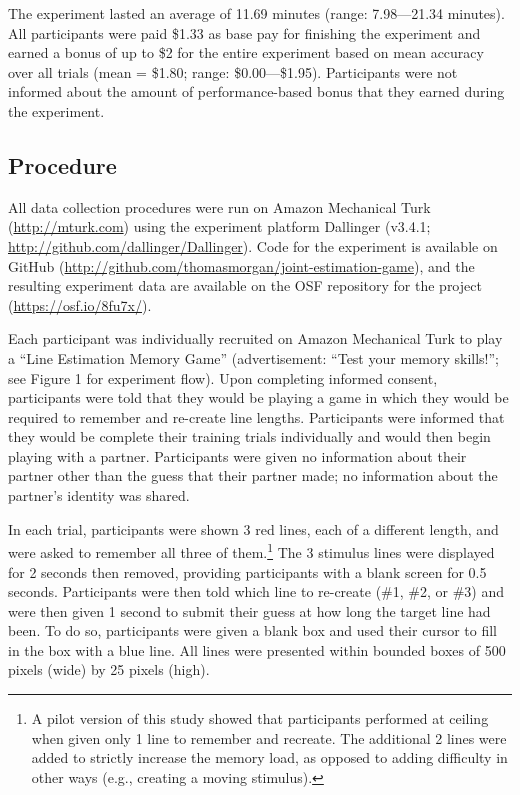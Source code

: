 \documentclass[10pt, letterpaper]{article}
\begin{document}
The experiment lasted an average of 11.69 minutes (range: 7.98---21.34
minutes). All participants were paid \$1.33 as base pay for finishing
the experiment and earned a bonus of up to \$2 for the entire experiment
based on mean accuracy over all trials (mean = \$1.80; range:
\$0.00---\$1.95). Participants were not informed about the amount of
performance-based bonus that they earned during the experiment.

\subsection{Procedure}\label{procedure}

All data collection procedures were run on Amazon Mechanical Turk
(\url{http://mturk.com}) using the experiment platform Dallinger
(v3.4.1; \url{http://github.com/dallinger/Dallinger}). Code for the
experiment is available on GitHub
(\url{http://github.com/thomasmorgan/joint-estimation-game}), and the
resulting experiment data are available on the OSF repository for the
project (\url{https://osf.io/8fu7x/}).

Each participant was individually recruited on Amazon Mechanical Turk to
play a ``Line Estimation Memory Game'' (advertisement: ``Test your
memory skills!''; see Figure 1 for experiment flow). Upon completing
informed consent, participants were told that they would be playing a
game in which they would be required to remember and re-create line
lengths. Participants were informed that they would be complete their
training trials individually and would then begin playing with a
partner. Participants were given no information about their partner
other than the guess that their partner made; no information about the
partner's identity was shared.

In each trial, participants were shown 3 red lines, each of a different
length, and were asked to remember all three of
them.\footnote{A pilot version of this study showed that participants performed at ceiling when given only 1 line to remember and recreate. The additional 2 lines were added to strictly increase the memory load, as opposed to adding difficulty in other ways (e.g., creating a moving stimulus).}
The 3 stimulus lines were displayed for 2 seconds then removed,
providing participants with a blank screen for 0.5 seconds. Participants
were then told which line to re-create (\#1, \#2, or \#3) and were then
given 1 second to submit their guess at how long the target line had
been. To do so, participants were given a blank box and used their
cursor to fill in the box with a blue line. All lines were presented
within bounded boxes of 500 pixels (wide) by 25 pixels (high).
\end{document}
